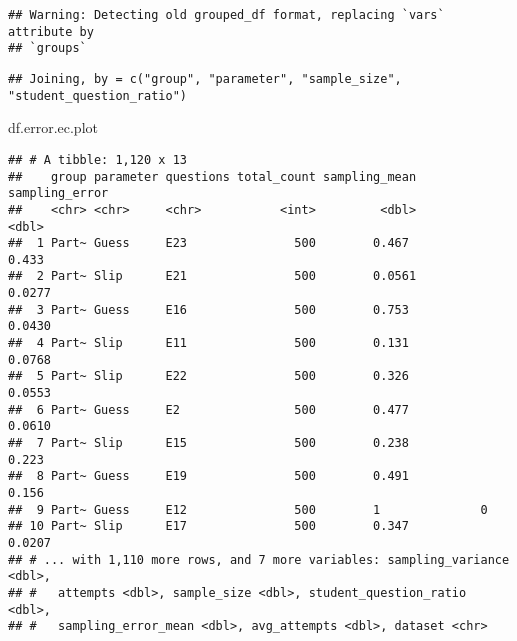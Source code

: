 \documentclass[]{article}
\newenvironment{Shaded}{\begin{snugshade}}{\end{snugshade}}
\newcommand{\DataTypeTok}[1]{\textcolor[rgb]{0.13,0.29,0.53}{#1}}
\newcommand{\KeywordTok}[1]{\textcolor[rgb]{0.13,0.29,0.53}{\textbf{#1}}}
\newcommand{\NormalTok}[1]{#1}
\newcommand{\OperatorTok}[1]{\textcolor[rgb]{0.81,0.36,0.00}{\textbf{#1}}}
\newcommand{\StringTok}[1]{\textcolor[rgb]{0.31,0.60,0.02}{#1}}
\begin{document}
\begin{verbatim}
## Warning: Detecting old grouped_df format, replacing `vars` attribute by
## `groups`
\end{verbatim}

\begin{Shaded}
\end{Shaded}

\begin{verbatim}
## Joining, by = c("group", "parameter", "sample_size", "student_question_ratio")
\end{verbatim}

\begin{Shaded}
\begin{Highlighting}[]
\NormalTok{df.error.ec.plot}
\end{Highlighting}
\end{Shaded}

\begin{verbatim}
## # A tibble: 1,120 x 13
##    group parameter questions total_count sampling_mean sampling_error
##    <chr> <chr>     <chr>           <int>         <dbl>          <dbl>
##  1 Part~ Guess     E23               500        0.467          0.433 
##  2 Part~ Slip      E21               500        0.0561         0.0277
##  3 Part~ Guess     E16               500        0.753          0.0430
##  4 Part~ Slip      E11               500        0.131          0.0768
##  5 Part~ Slip      E22               500        0.326          0.0553
##  6 Part~ Guess     E2                500        0.477          0.0610
##  7 Part~ Slip      E15               500        0.238          0.223 
##  8 Part~ Guess     E19               500        0.491          0.156 
##  9 Part~ Guess     E12               500        1              0     
## 10 Part~ Slip      E17               500        0.347          0.0207
## # ... with 1,110 more rows, and 7 more variables: sampling_variance <dbl>,
## #   attempts <dbl>, sample_size <dbl>, student_question_ratio <dbl>,
## #   sampling_error_mean <dbl>, avg_attempts <dbl>, dataset <chr>
\end{verbatim}
\end{document}
